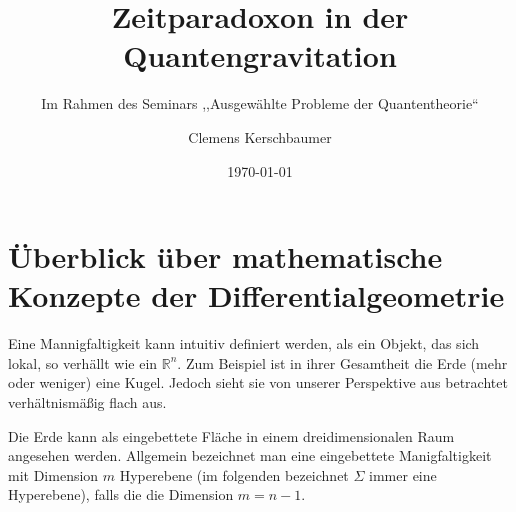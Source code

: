 \documentclass{scrartcl}
\title{Zeitparadoxon in der Quantengravitation}
\subtitle{Im Rahmen des Seminars ,,Ausgewählte Probleme der Quantentheorie``}
\author{Clemens Kerschbaumer}
\date{\today}
\begin{document}
	\maketitle
	\section{Überblick über mathematische Konzepte der Differentialgeometrie}
		Eine Mannigfaltigkeit kann intuitiv definiert werden, als ein Objekt, das sich lokal, so verhällt wie ein $\mathbb{R}^n$. Zum Beispiel
		ist in ihrer Gesamtheit die Erde (mehr oder weniger) eine Kugel. Jedoch sieht sie von unserer Perspektive aus betrachtet verhältnismäßig flach aus.
		
		Die Erde kann als eingebettete Fläche in einem dreidimensionalen Raum angesehen werden.
		Allgemein bezeichnet man eine eingebettete Manigfaltigkeit mit Dimension $m$ Hyperebene 
		(im folgenden bezeichnet $\Sigma$ immer eine Hyperebene), falls die die Dimension $m=n-1$. 
		
\end{document}
